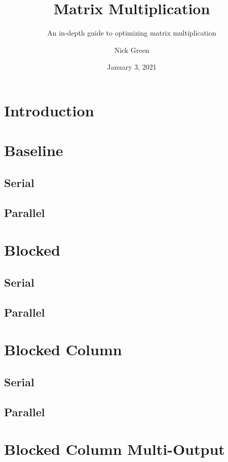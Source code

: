 \documentclass[11pt,fancy,authoryear]{elegantbook}
\title{Matrix Multiplication}
\subtitle{An in-depth guide to optimizing matrix multiplication}
\author{Nick Green}
\institute{CoffeeBeforeArch}
\date{January 3, 2021}
\begin{document}
\maketitle

\frontmatter
\tableofcontents

\mainmatter

\chapter{Introduction}

\chapter{Baseline}

\section{Serial}

\section{Parallel}

\chapter{Blocked}

\section{Serial}

\section{Parallel}

\chapter{Blocked Column}

\section{Serial}

\section{Parallel}

\chapter{Blocked Column Multi-Output}
\end{document}

